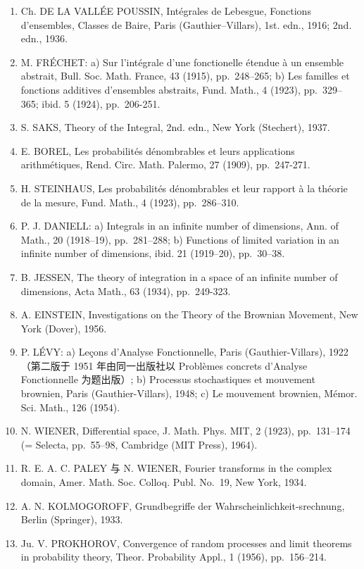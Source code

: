 
\begin{enumerate}
\def\labelenumi{(\Roman{enumi})}
\item
  Ch. DE LA VALLÉE POUSSIN, Intégrales de Lebesgue, Fonctions d'ensembles, Classes de Baire, Paris (Gauthier--Villars), 1st. edn., 1916; 2nd. edn., 1936.
\item
  M. FRÉCHET: a) Sur l'intégrale d'une fonctionelle étendue à un ensemble abstrait, Bull. Soc. Math. France, 43 (1915), pp.~248--265; b) Les familles et fonctions additives d'ensembles abstraits, Fund. Math., 4 (1923), pp.~329--365; ibid. 5 (1924), pp.~206-251.
\item
  S. SAKS, Theory of the Integral, 2nd. edn., New York (Stechert), 1937.
\item
  E. BOREL, Les probabilités dénombrables et leurs applications arithmétiques, Rend. Circ. Math. Palermo, 27 (1909), pp.~247-271.
\item
  H. STEINHAUS, Les probabilités dénombrables et leur rapport à la théorie de la mesure, Fund. Math., 4 (1923), pp.~286--310.
\item
  P. J. DANIELL: a) Integrals in an infinite number of dimensions, Ann. of Math., 20 (1918--19), pp.~281--288; b) Functions of limited variation in an infinite number of dimensions, ibid. 21 (1919--20), pp.~30--38.
\item
  B. JESSEN, The theory of integration in a space of an infinite number of dimensions, Acta Math., 63 (1934), pp.~249-323.
\item
  A. EINSTEIN, Investigations on the Theory of the Brownian Movement, New York (Dover), 1956.
\item
  P. LÉVY: a) Leçons d'Analyse Fonctionnelle, Paris (Gauthier-Villars), 1922（第二版于 1951 年由同一出版社以 Problèmes concrets d'Analyse Fonctionnelle 为题出版）; b) Processus stochastiques et mouvement brownien, Paris (Gauthier-Villars), 1948; c) Le mouvement brownien, Mémor. Sci. Math., 126 (1954).
\item
  N. WIENER, Differential space, J. Math. Phys. MIT, 2 (1923), pp.~131--174 (= Selecta, pp.~55--98, Cambridge (MIT Press), 1964).
\item
  R. E. A. C. PALEY 与 N. WIENER, Fourier transforms in the complex domain, Amer. Math. Soc. Colloq. Publ. No.~19, New York, 1934.
\item
  A. N. KOLMOGOROFF, Grundbegriffe der Wahrscheinlichkeit-srechnung, Berlin (Springer), 1933.
\item
  Ju. V. PROKHOROV, Convergence of random processes and limit theorems in probability theory, Theor. Probability Appl., 1 (1956), pp.~156--214.

\end{enumerate}
